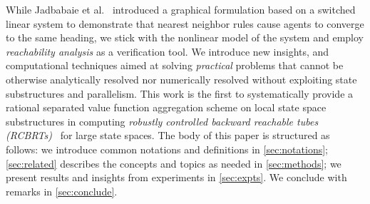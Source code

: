 While Jadbabaie et al.~\cite{JadbabaieCoord} introduced a graphical formulation based on a switched linear system to demonstrate that nearest neighbor rules cause agents to converge to the same heading, we stick with the nonlinear model of the system and employ \textit{reachability analysis} as a verification tool.  We introduce new insights, and computational techniques aimed at solving \textit{practical} problems that cannot be otherwise analytically resolved nor numerically resolved without exploiting state substructures and parallelism. This work is the first to systematically provide a rational separated value function aggregation  scheme on local state space substructures in computing \textit{robustly controlled backward reachable tubes  (RCBRTs)}~\cite{Mitchell2020} for large state spaces. The body of this paper is structured as follows: we introduce common notations and definitions in \autoref{sec:notations}; \autoref{sec:related} describes the concepts and topics as needed in \autoref{sec:methods}; we present results and insights from experiments in \autoref{sec:expts}. We  conclude with remarks in \autoref{sec:conclude}.  